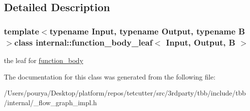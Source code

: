 \subsection{Detailed Description}
\subsubsection*{template$<$typename Input, typename Output, typename B$>$class internal\+::function\+\_\+body\+\_\+leaf$<$ Input, Output, B $>$}

the leaf for \hyperlink{classinternal_1_1function__body}{function\+\_\+body} 

The documentation for this class was generated from the following file\+:\begin{DoxyCompactItemize}
\item 
/\+Users/pourya/\+Desktop/platform/repos/tetcutter/src/3rdparty/tbb/include/tbb/internal/\+\_\+flow\+\_\+graph\+\_\+impl.\+h\end{DoxyCompactItemize}
